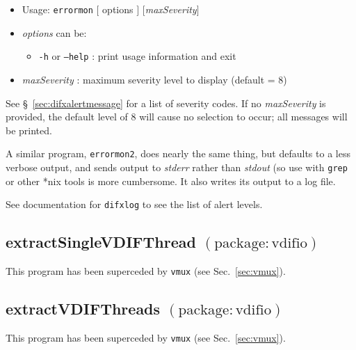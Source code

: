 \begin{itemize}
\item[] Usage: {\tt errormon} $[$ options $]$ $[${\em maxSeverity}$]$
\item[] {\em options} can be:
\begin{itemize}
\item[] {\tt -h} or {\tt --help} : print usage information and exit
\end{itemize}
\item[] {\em maxSeverity} : maximum severity level to display (default = 8)
\end{itemize}

See \S~\ref{sec:difxalertmessage} for a list of severity codes.
If no {\em maxSeverity} is provided, the default level of 8 will cause no selection to occur; all messages will be printed.

A similar program, {\tt errormon2}, does nearly the same thing, but defaults to a less verbose output, and sends output to {\em stderr} rather than {\em stdout} (so use with {\tt grep} or other *nix tools is more cumbersome.
It also writes its output to a log file.

See documentation for {\tt difxlog} to see the list of alert levels.










\subsection{extractSingleVDIFThread {\small $\mathrm{(package: vdifio)}$}}

This program has been superceded by {\tt vmux} (see Sec.~\ref{sec:vmux}).






\subsection{extractVDIFThreads {\small $\mathrm{(package: vdifio)}$}} 

This program has been superceded by {\tt vmux} (see Sec.~\ref{sec:vmux}).






